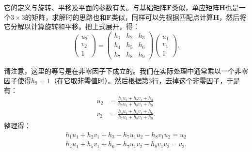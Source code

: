 它的定义与旋转、平移及平面的参数有关。与基础矩阵$\bm{F}$类似，单应矩阵$\bm{H}$也是一个$3 \times 3$的矩阵，求解时的思路也和$\bm{F}$类似，同样可以先根据匹配点计算$\bm{H}$，然后将它分解以计算旋转和平移。把上式展开，得：
\begin{equation}
\begin{pmatrix} 
u_{2}\\v_{2}\\1
\end{pmatrix}
=
\begin{pmatrix}
 h_{1} & h_{2} & h_{3}\\ 
 h_{4} & h_{5} & h_{6}\\ 
 h_{7} & h_{8} & h_{9} 
\end{pmatrix}
\begin{pmatrix} 
u_{1}\\v_{1}\\1
\end{pmatrix}.
\end{equation}

请注意，这里的等号是在非零因子下成立的。我们在实际处理中通常乘以一个非零因子使得$h_9 = 1$（在它取非零值时）。然后根据第3行，去掉这个非零因子，于是有：
\[
\begin{aligned}
u_{2}&=\frac{h_{1}u_{1}+h_{2}v_{1}+h_{3}}{h_{7}u_{1}+h_{8}v_{1}+h_{9}}\\
v_{2}&=\frac{h_{4}u_{1}+h_{5}v_{1}+h_{6}}{h_{7}u_{1}+h_{8}v_{1}+h_{9}}.
\end{aligned}
\]
整理得：
\[
\begin{gathered}
h_{1}u_{1}+h_{2}v_{1}+h_{3}-h_{7}u_{1}u_{2}-h_{8}v_{1}u_{2}=u_{2}\\
h_{4}u_{1}+h_{5}v_{1}+h_{6}-h_{7}u_{1}v_{2}-h_{8}v_{1}v_{2}=v_{2}.
\end{gathered}
\]

